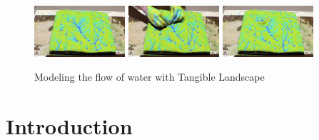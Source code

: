 \documentclass{isprs}
\begin{document}

\maketitle

\begin{figure}[ht!]
\begin{center}
		\includegraphics[width=0.3\textwidth]{figures/sequence_2.jpg}
		\includegraphics[width=0.3\textwidth]{figures/sequence_3.jpg}
		\includegraphics[width=0.3\textwidth]{figures/sequence_4.jpg}
	\caption{Modeling the flow of water with Tangible Landscape}
	\label{fig:tl_flow}
\end{center}
\end{figure}


\section{Introduction}\label{sec:introduction}
\end{document}
